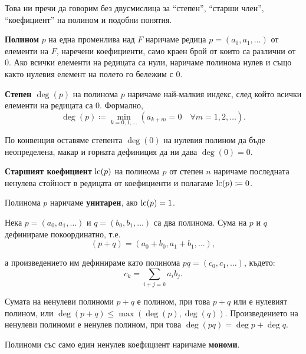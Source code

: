 \documentclass[
  headings=standardclasses,
  bibliography=totocnumbered,
]{scrartcl}
\begin{document}
Това ни пречи да говорим без двусмислица за \enquote{степен}, \enquote{старши член}, \enquote{коефициент} на полином и подобни понятия.

\begin{definition}
  \textbf{Полином} \( p \) на една променлива над \( F \) наричаме редица \( p = (a_0, a_1, \ldots) \) от елементи на \( F \), наречени коефициенти, само краен брой от които са различни от \( 0 \). Ако всички елементи на редицата са нули, наричаме полинома нулев и също както нулевия елемент на полето го бележим с \( 0 \).

  \textbf{Степен \( \deg(p) \)} на полинома \( p \) наричаме най-малкия индекс, след който всички елементи на редицата са \( 0 \). Формално,
  \begin{equation*}
    \deg(p) \coloneqq \min_{k = 0, 1, \ldots} (a_{k + m} = 0 \quad\forall m = 1, 2, \ldots).
  \end{equation*}

  По конвенция оставяме степента \( \deg(0) \) на нулевия полином да бъде неопределена, макар и горната дефиниция да ни дава \( \deg(0) = 0 \).

  \textbf{Старшият коефициент} \( \operatorname{lc}(p) \) на полинома \( p \) от степен \( n \) наричаме последната ненулева стойност в редицата от коефициенти и полагаме \( \operatorname{lc}(p) \coloneqq 0 \). 

  Полинома \( p \) наричаме \textbf{унитарен}, ако \( \operatorname{lc}(p) = 1 \).
\end{definition}

Нека \( p = (a_0, a_1, \ldots) \) и \( q = (b_0, b_1, \ldots) \) са два полинома. Сума на \( p \) и \( q \) дефинираме покоординатно, т.е.
\begin{equation*}
  (p + q) = (a_0 + b_0, a_1 + b_1, \ldots),
\end{equation*}

а произведението им дефинираме като полинома \( pq = (c_0, c_1, \ldots) \), където:
\begin{equation*}
  c_k = \sum_{i+j=k} a_i b_j.
\end{equation*}

Сумата на ненулеви полиноми \( p + q \) е полином, при това \( p + q \) или е нулевият полином, или \( \deg(p + q) \leq \max(\deg(p), \deg(q)) \). Произведението на ненулеви полиноми е ненулев полином, при това \( \deg(pq) = \deg p + \deg q \).

Полиноми със само един ненулев коефициент наричаме \textbf{мономи}.
\end{document}
